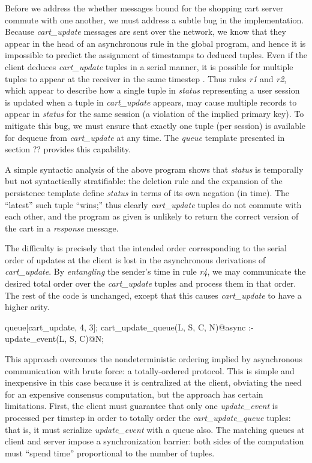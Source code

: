 Before we address the whether messages bound for the shopping cart server commute 
with one another, we must address a subtle bug in the implementation.  Because {\em cart\_update}
messages are sent over the network, we know that they appear in the head of an asynchronous 
rule in the global program, and hence it is impossible to predict the assignment of timestamps
to deduced tuples.  Even if the client deduces {\em cart\_update} tuples in a serial manner, it
is possible for multiple tuples to appear at the receiver in the same timestep .  Thus rules {\em r1} 
and {\em r2}, which appear to describe how a single tuple in {\em status} representing a user
session is updated when a tuple in {\em cart\_update} appears, may cause multiple records
to appear in {\em status} for the same session (a violation of the implied primary key).
To mitigate this bug, we must ensure that exactly one tuple (per session) is available for dequeue
from {\em cart\_update} at any time.  The \emph{queue} template presented in section ?? 
provides this capability.


A simple syntactic analysis of the above program shows that {\em status} 
is temporally but not syntactically stratifiable: the deletion rule and the expansion of the
persistence template define {\em status} in terms of its own negation (in time).  The ``latest''
such tuple ``wins;'' thus clearly {\em cart\_update} tuples do not commute with each other,
and the program as given is unlikely to return the correct version of the cart in a {\em response}
message.

The difficulty is precisely that the intended order corresponding to the serial order of updates
at the client is lost in the asynchronous derivations of {\em cart\_update}.  By \emph{entangling}
the sender's time in rule  {\em r4}, we may communicate the desired total order over 
the {\em cart\_update} tuples and process them in that order.  The rest of the code is unchanged,
except that this causes {\em cart\_update} to have a higher arity.

\begin{Dedalus}
queue[cart_update, 4, 3];
cart_update_queue(L, S, C, N)@async :- 
    update_event(L, S, C)@N;
\end{Dedalus}

This approach overcomes the nondeterministic ordering implied by asynchronous 
communication with brute force: a totally-ordered protocol.  This is simple and inexpensive 
in this case because it is centralized at the client, obviating the need for an expensive consensus computation, but the approach has certain limitations.  First, the client
must guarantee that only one {\em update\_event} is processed per timstep in order to totally
order the {\em cart\_update\_queue} tuples: that is, it must serialize {\em update\_event} with
a queue also.  The matching queues at client and server impose a synchronization barrier: both sides of the computation must ``spend time'' proportional to the number of tuples.


